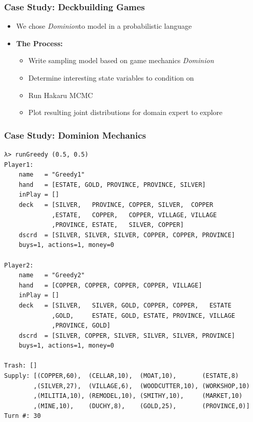\begin{frame} \frametitle{Case Study: Deckbuilding Games}
\begin{itemize}
\item We chose \emph{Dominion}\footnotemark to model in a probabilistic language
\item {\bf The Process:}
  \begin{itemize}
  \item Write sampling model based on game mechanics \emph{Dominion}
  \item Determine interesting state variables to condition on
  \item Run Hakaru MCMC
  \item Plot resulting joint distributions for domain expert to explore
  \end{itemize}
\end{itemize}
\end{frame}

\begin{frame}[fragile=singleslide] \frametitle{Case Study: Dominion Mechanics}
\begin{center}
\begin{Verbatim}[fontsize=\tiny]
λ> runGreedy (0.5, 0.5)
Player1:
    name   = "Greedy1"
    hand   = [ESTATE, GOLD, PROVINCE, PROVINCE, SILVER]
    inPlay = []
    deck   = [SILVER,   PROVINCE, COPPER, SILVER,  COPPER
             ,ESTATE,   COPPER,   COPPER, VILLAGE, VILLAGE
             ,PROVINCE, ESTATE,   SILVER, COPPER]
    dscrd  = [SILVER, SILVER, SILVER, COPPER, COPPER, PROVINCE]
    buys=1, actions=1, money=0

Player2:
    name   = "Greedy2"
    hand   = [COPPER, COPPER, COPPER, COPPER, VILLAGE]
    inPlay = []
    deck   = [SILVER,   SILVER, GOLD, COPPER, COPPER,   ESTATE
             ,GOLD,     ESTATE, GOLD, ESTATE, PROVINCE, VILLAGE
             ,PROVINCE, GOLD]
    dscrd  = [SILVER, COPPER, SILVER, SILVER, SILVER, PROVINCE]
    buys=1, actions=1, money=0

Trash: []
Supply: [(COPPER,60),  (CELLAR,10),  (MOAT,10),       (ESTATE,8)
        ,(SILVER,27),  (VILLAGE,6),  (WOODCUTTER,10), (WORKSHOP,10)
        ,(MILITIA,10), (REMODEL,10), (SMITHY,10),     (MARKET,10)
        ,(MINE,10),    (DUCHY,8),    (GOLD,25),       (PROVINCE,0)]
Turn #: 30
\end{Verbatim}
\end{center}
\end{frame}

